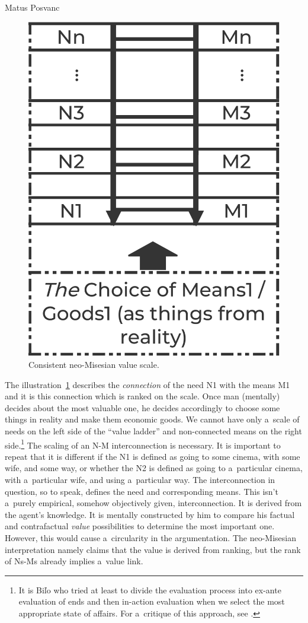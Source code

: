 \begin{artengenv}{Matus Posvanc}
\begin{figure}
 \begin{center}
 \includegraphics[width=.35\textwidth]{ART_Posvanc/Illustration1_PU.pdf}%
 \end{center}%
 \caption{Consistent neo-Misesian value scale.}\label{pos:fig1}
\end{figure}




The illustration~\ref{pos:fig1} describes the \textit{connection} of the need N1 with the means M1 and it is this connection which is ranked on the scale. Once man (mentally) decides about the most valuable one, he decides accordingly to choose some things in reality and make them economic goods. We cannot have only a~scale of needs on the left side of the ``value ladder'' and non-connected means on the right side.\footnote{It is Biľo 
\parencite*[][]{Bilo2004Theory} %
 who tried at least to divide the evaluation process into ex-ante evaluation of ends and then in-action evaluation when we select the most appropriate state of affairs. For a~critique of this approach, see 
\parencite[][]{Posvanc2019Evolutionary}.%
} The scaling of an N-M interconnection is necessary. It is important to repeat that it is different if the N1 is defined as going to some cinema, with some wife, and some way, or whether the N2 is defined as going to a~particular cinema, with a~particular wife, and using a~particular way. The interconnection in question, so to speak, defines the need and corresponding means. This isn't a~purely empirical, somehow objectively given, interconnection. It is derived from the agent's knowledge. It is mentally constructed by him to compare his factual and contrafactual \textit{value} possibilities to determine the most important one. However, this would cause a~circularity in the argumentation. The neo-Misesian interpretation namely claims that the value is derived from ranking, but the rank of Ns-Ms already implies a~value link.




\end{artengenv}
